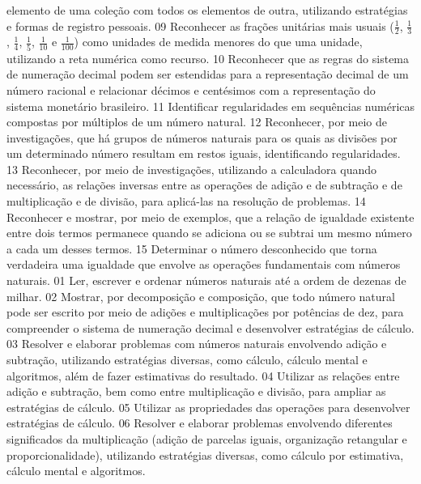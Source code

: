 {{{				elemento de uma coleção com todos os elementos de outra, utilizando estratégias e formas de
				registro pessoais.
			}
			{09}{%
				Reconhecer as frações unitárias mais usuais (\(\frac{1}{2}\), \(\frac{1}{3}\), \(\frac{1}{4}\), \(\frac{1}{5}\), \(\frac{1}{10}\) e \(\frac{1}{100}\)) como
				unidades de medida menores do que uma unidade, utilizando a reta numérica como recurso.
			}
			{10}{%
				Reconhecer que as regras do sistema de numeração decimal podem ser estendidas
				para a representação decimal de um número racional e relacionar décimos e centésimos com a
				representação do sistema monetário brasileiro.
			}
			{11}{%
				Identificar regularidades em sequências numéricas compostas por múltiplos de um
				número natural.
			}
			{12}{%
				Reconhecer, por meio de investigações, que há grupos de números naturais para os
				quais as divisões por um determinado número resultam em restos iguais, identificando regularidades.
			}
			{13}{%
				Reconhecer, por meio de investigações, utilizando a calculadora quando necessário, as
				relações inversas entre as operações de adição e de subtração e de multiplicação e de divisão, para
				aplicá-las na resolução de problemas.
			}
			{14}{%
				Reconhecer e mostrar, por meio de exemplos, que a relação de igualdade existente
				entre dois termos permanece quando se adiciona ou se subtrai um mesmo número a cada um desses
				termos.
			}
			{15}{%
				Determinar o número desconhecido que torna verdadeira uma igualdade que envolve as
				operações fundamentais com números naturais.
			}
			{01}{%
				Ler, escrever e ordenar números naturais até a ordem de dezenas de milhar.
			}
			{02}{%
				Mostrar, por decomposição e composição, que todo número natural pode ser escrito
				por meio de adições e multiplicações por potências de dez, para compreender o sistema de
				numeração decimal e desenvolver estratégias de cálculo.
			}
			{03}{%
				Resolver e elaborar problemas com números naturais envolvendo adição e subtração,
				utilizando estratégias diversas, como cálculo, cálculo mental e algoritmos, além de fazer estimativas
				do resultado.
			}
			{04}{%
				Utilizar as relações entre adição e subtração, bem como entre multiplicação e divisão,
				para ampliar as estratégias de cálculo.
			}
			{05}{%
				Utilizar as propriedades das operações para desenvolver estratégias de cálculo.
			}
			{06}{%
				Resolver e elaborar problemas envolvendo diferentes significados da multiplicação
				(adição de parcelas iguais, organização retangular e proporcionalidade), utilizando estratégias
				diversas, como cálculo por estimativa, cálculo mental e algoritmos.
}}}
